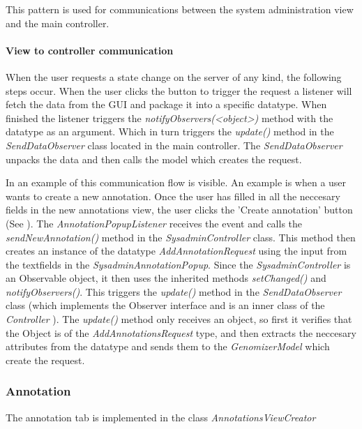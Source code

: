 This pattern is used for communications between the system administration view and the main controller.

\paragraph{View to controller communication}


When the user requests a state change on the server of any kind, the following steps occur. When the user clicks the button to trigger the request a listener will fetch the data from the GUI and package it into a specific datatype. When finished the listener triggers the \textit{notifyObservers(<object>)} method with the datatype as an argument. Which in turn triggers the \textit{update()} method in the \textit{SendDataObserver} class located in the main controller. The \textit{SendDataObserver} unpacks the data and then calls the model which creates the request.

In  an example of this communication flow is visible. An example is when a user wants to create a new annotation. Once the user has filled in all the neccesary fields in the new annotations view, the user clicks the 'Create annotation' button (See ). The \textit{AnnotationPopupListener} receives the event and calls the \textit{sendNewAnnotation()} method in the \textit{SysadminController} class. This method then creates an instance of the datatype \textit{AddAnnotationRequest} using the input from the textfields in the \textit{SysadminAnnotationPopup}. Since the  \textit{SysadminController} is an Observable object, it then uses the inherited methods \textit{setChanged()} and \textit{notifyObservers()}. This triggers the \textit{update()} method in the \textit{SendDataObserver} class (which implements the Observer interface and is an inner class of the \textit{Controller} ). The \textit{update()} method only receives an object, so first it verifies that the Object is of the \textit{AddAnnotationsRequest} type, and then extracts the neccesary attributes from the datatype and sends them to the \textit{GenomizerModel} which create the request.





\subsubsection{Annotation}

The annotation tab is implemented in the class \textit{AnnotationsViewCreator} 

